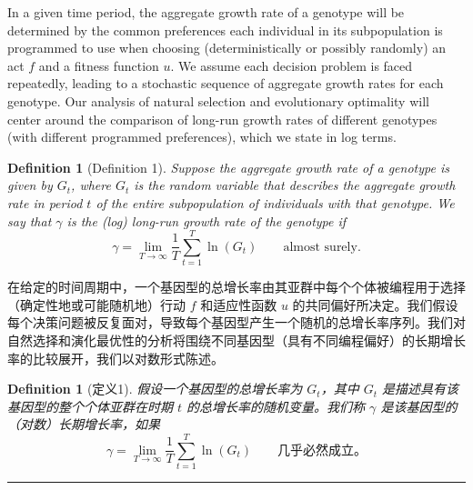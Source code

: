 \documentclass[12pt,a4paper]{article}
\newenvironment{original}
  {\par\noindent\color{black}\smallskip}
  {\par\smallskip}
\newenvironment{translation}
  {\par\noindent\color{blue!70!black}\smallskip}
  {\par\medskip\hrule\medskip}
\newtheorem{definition}[theorem]{Definition}
\begin{document}
\begin{original}
In a given time period, the aggregate growth rate of a genotype will be determined by the common preferences each individual in its subpopulation is programmed to use when choosing (deterministically or possibly randomly) an act $f$ and a fitness function $u$. We assume each decision problem is faced repeatedly, leading to a stochastic sequence of aggregate growth rates for each genotype. Our analysis of natural selection and evolutionary optimality will center around the comparison of long-run growth rates of different genotypes (with different programmed preferences), which we state in log terms.

\begin{definition}[Definition 1]
Suppose the aggregate growth rate of a genotype is given by $G_t$, where $G_t$ is the random variable that describes the aggregate growth rate in period $t$ of the entire subpopulation of individuals with that genotype. We say that $\gamma$ is the (log) long-run growth rate of the genotype if
\[
\gamma = \lim_{T \to \infty} \frac{1}{T} \sum_{t=1}^{T} \ln(G_t) \qquad \text{almost surely}.
\]
\end{definition}
\end{original}
\begin{translation}
在给定的时间周期中，一个基因型的总增长率由其亚群中每个个体被编程用于选择（确定性地或可能随机地）行动 $f$ 和适应性函数 $u$ 的共同偏好所决定。我们假设每个决策问题被反复面对，导致每个基因型产生一个随机的总增长率序列。我们对自然选择和演化最优性的分析将围绕不同基因型（具有不同编程偏好）的长期增长率的比较展开，我们以对数形式陈述。

\begin{definition}[定义1]
假设一个基因型的总增长率为 $G_t$，其中 $G_t$ 是描述具有该基因型的整个个体亚群在时期 $t$ 的总增长率的随机变量。我们称 $\gamma$ 是该基因型的（对数）长期增长率，如果
\[
\gamma = \lim_{T \to \infty} \frac{1}{T} \sum_{t=1}^{T} \ln(G_t) \qquad \text{几乎必然成立}。
\]
\end{definition}
\end{translation}
\end{document}
